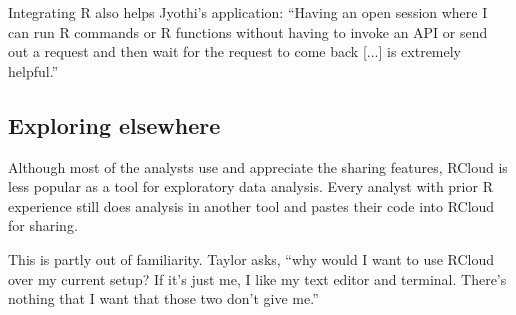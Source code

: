 Integrating R also helps Jyothi's application: ``Having an open session
where I can run R commands or R functions without having to invoke an API
or send out a request and then wait for the request to come back [...] is
extremely helpful.''




\subsection{Exploring elsewhere}

Although most of the analysts use and appreciate the sharing features,
RCloud is less popular as a tool for exploratory data analysis. Every
analyst with prior R experience still does analysis in another tool and
pastes their code into RCloud for sharing.

This is partly out of familiarity. Taylor asks, ``why would I want to use
RCloud over my current setup? If it's just me, I like my text editor and
terminal. There's nothing that I want that those two don't give me.''




